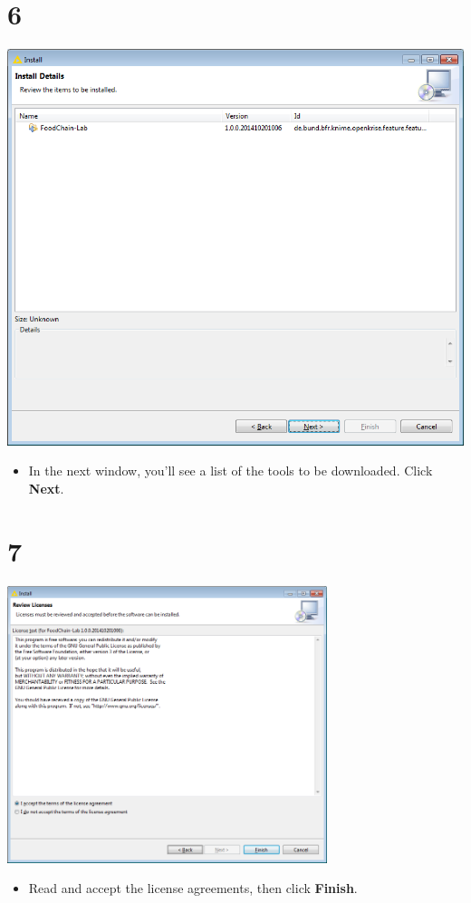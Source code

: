 \documentclass{beamer}
\begin{document}
\section{6}
\begin{frame}
	\begin{center}
  		\includegraphics[height=0.7\textheight]{6.png}
	\end{center}
	\begin{itemize}
		\item In the next window, you'll see a list of the tools to be downloaded. Click \textbf{Next}.
	\end{itemize}
\end{frame}

\section{7}
\begin{frame}
	\begin{center}
  		\includegraphics[width=0.7\textwidth]{7.png}
	\end{center}
	\begin{itemize}
		\item Read and accept the license agreements, then click \textbf{Finish}.
	\end{itemize}
\end{frame}
\end{document}
